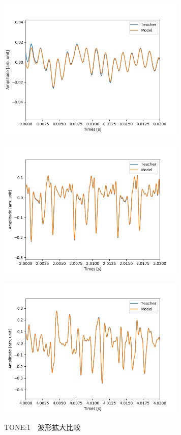 \documentclass{jreport}		%
\begin{document}
\begin{figure}[htbp]
\begin{minipage}{0.5\hsize}
\begin{center}
 \end{center}
 \label{fig:one}
 \end{minipage}
 \begin{minipage}{0.5\hsize}
 \begin{center}
  \includegraphics[width=90mm]{tone1_output_hikaku4.png}
 \end{center}
 \label{fig:two}
 \end{minipage}
 \begin{minipage}{0.5\hsize}
 \begin{center}
  \includegraphics[width=90mm]{tone1_output_hikaku5.png}
 \end{center}
 \label{fig:one}
 \end{minipage}
 \begin{minipage}{0.5\hsize}
 \begin{center}
  \includegraphics[width=90mm]{tone1_output_hikaku6.png}
 \end{center}
 \label{fig:two}
 \end{minipage}
 \caption{TONE:1　波形拡大比較}
\end{figure}
\end{document}

